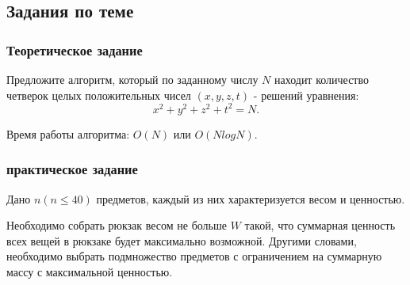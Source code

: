 \subsection{Задания по теме}
\subsubsection{Теоретическое задание}
Предложите алгоритм, который по заданному числу $N$ находит количество четверок целых положительных чисел $(x, y, z, t)$ - решений уравнения: $$x^{2} + y^{2} + z^{2} + t^{2} = N.$$

Время работы алгоритма: $O(N)$ или $O(NlogN)$.

\subsubsection{практическое задание}
Дано $n (n \le 40)$ предметов, каждый из них характеризуется весом и ценностью.

Необходимо собрать рюкзак весом не больше $W$ такой, что суммарная ценность всех вещей в рюкзаке будет максимально возможной. Другими словами, необходимо выбрать подмножество предметов с ограничением на суммарную массу с максимальной ценностью.

